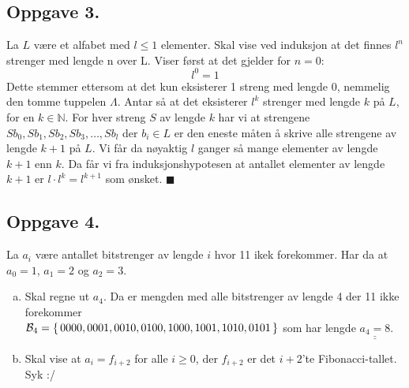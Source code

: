 \documentclass{article}
\begin{document}
\subsection*{Oppgave 3.}
La $L$ være et alfabet med $l \leq 1$ elementer. Skal vise ved induksjon at det finnes $l^n$ strenger med lengde n over L.
Viser først at det gjelder for $n = 0$:
$$l^0 = 1$$
Dette stemmer ettersom at det kun eksisterer 1 streng med lengde 0, nemmelig den tomme tuppelen $\Lambda$.
Antar så at det eksisterer $l^k$ strenger med lengde $k$ på $L$, for en $k \in \mathbb{N}$. For hver streng $S$ av lengde $k$ 
har vi at strengene $Sb_0, Sb_1, Sb_2, Sb_3, \dots, Sb_l$ der $b_i \in L$ er den eneste måten å skrive alle strengene av lengde $k + 1$ på $L$.
Vi får da nøyaktig $l$ ganger så mange elementer av lengde $k + 1$ enn $k$. Da får vi fra induksjonshypotesen at antallet elementer av lengde $k + 1$
er $l \cdot l^k = l^{k+1}$ som ønsket. $\blacksquare$

\subsection*{Oppgave 4.}
La $a_i$ være antallet bitstrenger av lengde $i$ hvor 11 ikek forekommer. Har da at $a_0 = 1$, $a_1 = 2$ og $a_2 = 3$.
\begin{enumerate}[(a)]
	\item {
        Skal regne ut $a_4$. Da er mengden med alle bitstrenger av lengde 4 der 11 ikke forekommer \\
        $\mathcal{B}_4 = \set{0000, 0001, 0010, 0100, 1000, 1001, 1010, 0101}$ som har lengde $\underline{\underline{a_4 = 8}}$.
    }
    \item {
        Skal vise at $a_i = f_{i + 2}$ for alle $i \geq 0$, der $f_{i + 2}$ er det $i + 2$'te Fibonacci-tallet. Syk :/
    }
\end{enumerate}
\end{document}

